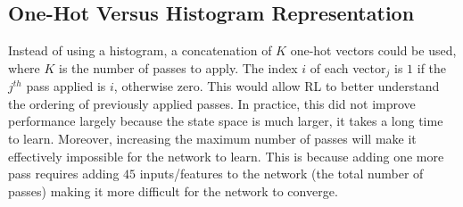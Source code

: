 \subsection{One-Hot Versus Histogram Representation}
Instead of using a histogram, a concatenation of $K$ one-hot vectors could be used, where $K$ is the number of passes to apply. The index $i$ of each vector$_j$ is $1$ if the $j^{th}$ pass applied is $i$, otherwise zero. This would allow RL to better understand the ordering of previously applied passes.
In practice, this did not improve performance largely because the state space is much larger, it takes a long time to learn. Moreover, increasing the maximum number of passes will make it effectively impossible for the network to learn. This is because adding one more pass requires adding $45$ inputs/features to the network (the total number of passes) making it more difficult for the network to converge.